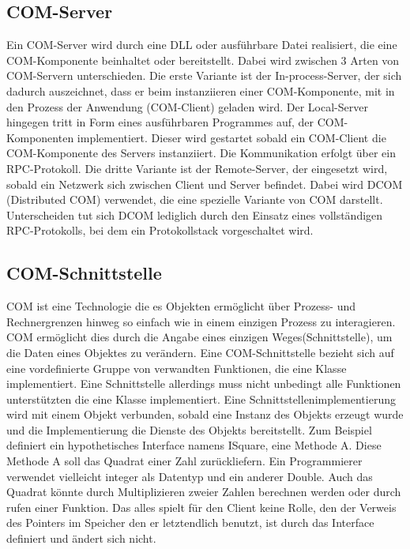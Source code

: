 \subsection{COM-Server}
\label{ch:grundlagen:sec:ComponentObjectModel:subsec:COMServer}

Ein COM-Server wird durch eine DLL oder ausführbare Datei realisiert, die eine COM-Komponente beinhaltet oder bereitstellt. Dabei wird zwischen 3 Arten von COM-Servern unterschieden. Die erste Variante ist der In-process-Server, der sich dadurch auszeichnet, dass er beim instanziieren einer COM-Komponente, mit in den Prozess der Anwendung (COM-Client) geladen wird. Der Local-Server hingegen tritt in Form eines ausführbaren Programmes auf, der COM-Komponenten implementiert. Dieser wird gestartet sobald ein COM-Client die COM-Komponente des Servers instanziiert. Die Kommunikation erfolgt über ein RPC-Protokoll. Die dritte Variante ist der Remote-Server, der eingesetzt wird, sobald ein Netzwerk sich zwischen Client und Server befindet. Dabei wird DCOM (Distributed COM) verwendet, die eine spezielle Variante von COM darstellt. Unterscheiden tut sich DCOM lediglich durch den Einsatz eines vollständigen RPC-Protokolls, bei dem ein Protokollstack vorgeschaltet wird. 
 
\subsection{COM-Schnittstelle}
\label{ch:grundlagen:sec:ComponentObjectModel:subsec:COMSchnittstelle}

COM ist eine Technologie die es Objekten ermöglicht über Prozess- und Rechnergrenzen hinweg so einfach wie in einem einzigen Prozess zu interagieren. COM ermöglicht dies durch die Angabe eines einzigen Weges(Schnittstelle), um die Daten eines Objektes zu verändern. Eine COM-Schnittstelle bezieht sich auf eine vordefinierte Gruppe von verwandten Funktionen, die eine Klasse implementiert. Eine Schnittstelle allerdings muss nicht unbedingt alle Funktionen unterstützten die eine Klasse implementiert. Eine Schnittstellenimplementierung wird mit einem Objekt verbunden, sobald eine Instanz des Objekts erzeugt wurde und die Implementierung die Dienste des Objekts bereitstellt. Zum Beispiel definiert ein hypothetisches Interface namens ISquare, eine Methode A. Diese Methode A soll das Quadrat einer Zahl zurückliefern. Ein Programmierer verwendet vielleicht integer als Datentyp und ein anderer Double. Auch das Quadrat könnte durch Multiplizieren zweier Zahlen berechnen werden oder durch rufen einer Funktion. Das alles spielt für den Client keine Rolle, den der Verweis des Pointers im Speicher den er letztendlich benutzt, ist durch das Interface definiert und ändert sich nicht. 

